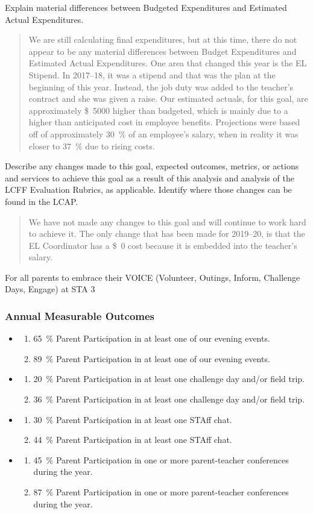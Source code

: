 \documentclass{article}
\makeatletter
\newcommand{\dollar}[1]{\SI{#1}[\$]{}}
\newcounter{goal}[section] %
\newcommand*{\expact}[1]{%
	\expandafter\@expact\csname c@#1\endcsname%
}
\newcommand*{\@expact}[1]{%
	$\ifcase\intcalcAdd{1}{\intcalcMod{\intcalcSub{#1}{1}}{2}}
		\or{\text{Expected:}}
		\or{\text{Actual:}}
    \else\@ctrerr\fi$
}
\newcommand{\outcome}[2]{
	\item
	\begin{enumerate}[label=\expact*]
	\setlength{\itemsep}{0pt}
	\item #1
	\item #2
	\end{enumerate}
}
\newenvironment{outcomes}
	{
		\subsubsection{Annual Measurable Outcomes}
		\begin{itemize}[label={}]
	}
	{\end{itemize}}
\newcounter{action}[goal]
\makeatother
\begin{document}
Explain material differences between Budgeted Expenditures and Estimated Actual Expenditures.
\begin{quotation}
	We are still calculating final expenditures, but at this time, there do not appear to be any material differences between Budget Expenditures and Estimated Actual Expenditures. One area that changed this year is the EL Stipend. In 2017--18, it was a stipend and that was the plan at the beginning of this year. Instead, the job duty was added to the teacher's contract and she was given a raise. Our estimated actuals, for this goal, are approximately \dollar{5000} higher than budgeted, which is mainly due to a higher than anticipated cost in employee benefits. Projections were based off of approximately \SI{30}{\percent} of an employee's salary, when in reality it was closer to \SI{37}{\percent} due to rising costs.
\end{quotation}

Describe any changes made to this goal, expected outcomes, metrics, or actions and services to achieve this goal as a result of this analysis and analysis of the LCFF Evaluation Rubrics, as applicable. Identify where those changes can be found in the LCAP.
\begin{quotation}
	We have not made any changes to this goal and will continue to work hard to achieve it. The only change that has been made for 2019--20, is that the EL Coordinator has a \dollar{0} cost because it is embedded into the teacher's salary.
\end{quotation}

\Goal
	{For all parents to embrace their VOICE (Volunteer, Outings, Inform, Challenge Days, Engage) at STA}
	{3}
	{}

\begin{outcomes}
	\outcome
	{\SI{65}{\percent} Parent Participation in at least one of our evening events.}
	{\SI{89}{\percent} Parent Participation in at least one of our evening events.}
	\outcome
	{\SI{20}{\percent} Parent Participation in at least one challenge day and/or field trip.}
	{\SI{36}{\percent} Parent Participation in at least one challenge day and/or field trip.}
	\outcome
	{\SI{30}{\percent} Parent Participation in at least one STAff chat.}
	{\SI{44}{\percent} Parent Participation in at least one STAff chat.}
	\outcome
	{\SI{45}{\percent} Parent Participation in one or more parent-teacher conferences during the year.}
	{\SI{87}{\percent} Parent Participation in one or more parent-teacher conferences during the year.}
\end{outcomes}
\end{document}

